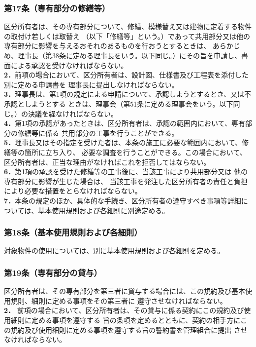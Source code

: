 \documentclass[
  luatex,
  paper=a4paper,
  fontsize=11pt,
  jafontsize=11pt,
  jlreq_notes,
]{jlreq}
\begin{document}
  \subsubsection*{第17条（専有部分の修繕等）}
  区分所有者は、その専有部分について、修繕、模様替え又は建物に定着する物件の取付け若しくは取替え
  （以下「修繕等」という。）であって共用部分又は他の専有部分に影響を与えるおそれのあるものを行おうとするときは、
  あらかじめ、理事長（第38条に定める理事長をいう。以下同じ。）にその旨を申請し、書面による承認を受けなければならない。\\
  \textbf{2．}前項の場合において、区分所有者は、設計図、仕様書及び工程表を添付した別に定める申請書を
  理事長に提出しなければならない。\\
  \textbf{3．}理事長は、第1項の規定による申請について、承認しようとするとき、又は不承認としようとする
  ときは、理事会（第51条に定める理事会をいう。以下同じ。）の決議を経なければならない。\\
  \textbf{4．}第1項の承認があったときは、区分所有者は、承認の範囲内において、専有部分の修繕等に係る
  共用部分の工事を行うことができる。\\
  \textbf{5．}理事長又はその指定を受けた者は、本条の施工に必要な範囲内において、修繕等の箇所に立ち入り、
  必要な調査を行うことができる。この場合において、区分所有者は、正当な理由がなければこれを拒否してはならない。\\
  \textbf{6．}第1項の承認を受けた修繕等の工事後に、当該工事により共用部分又は 他の専有部分に影響が生じた場合は、
  当該工事を発注した区分所有者の責任と負担により必要な措置をとらなければならない。\\
  \textbf{7．}本条の規定のほか、具体的な手続き、区分所有者の遵守すべき事項等詳細については、基本使用規則および各細則に別途定める。

  \subsubsection*{第18条（基本使用規則および各細則）}
  対象物件の使用については、別に基本使用規則および各細則を定める。

  \subsubsection*{第19条（専有部分の貸与）}
  区分所有者は、その専有部分を第三者に貸与する場合には、この規約及び基本使用規則、細則に定める事項をその第三者に
  遵守させなければならない。\\
  \textbf{2．} 前項の場合において、区分所有者は、その貸与に係る契約にこの規約及び使用細則に定める事項を遵守する
  旨の条項を定めるとともに、契約の相手方にこの規約及び使用細則に定める事項を遵守する旨の誓約書を管理組合に提出
  させなければならない。
  
\end{document}
